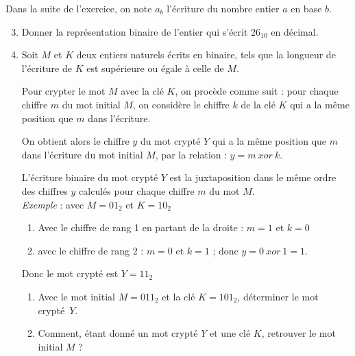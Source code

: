 \documentclass[a4paper,12pt]{article}
\begin{document}
Dans la suite de l'exercice, on note $a_b$ l'écriture du nombre entier $a$ en base $b$.

\begin{enumerate}[\bfseries 1.]
    \setcounter{enumi}{2}
    \item Donner la représentation binaire de l'entier qui s'écrit $26_{10}$ en décimal.
    \item Soit $M$ et $K$ deux entiers naturels écrits en binaire, tels que la longueur de l'écriture de $K$ est supérieure ou égale à celle de $M$.

    Pour crypter le mot $M$ avec la clé $K$, on procède comme suit : pour chaque chiffre $m$ du mot
    initial $M$, on considère le chiffre $k$ de la clé $K$ qui a la même position que $m$ dans l'écriture.

    On obtient alors le chiffre $y$ du mot crypté $Y$ qui a la même position que $m$ dans l'écriture du mot initial $M$, par la relation : $y = m \:xor\: k$.

    L'écriture binaire du mot crypté $Y$ est la juxtaposition dans le même ordre des chiffres $y$ calculés pour chaque chiffre $m$ du mot $M$.\\

        \emph{Exemple }:  avec $M = 01_2$ et $K = 10_2$\\
        \begin{enumerate}[--]
            \item Avec le chiffre de rang 1 en partant de la droite : $m = 1$ et $k = 0$
            \item avec le chiffre de rang 2 :  $m = 0$ et $k = 1$ ; donc $y = 0 \:xor\: 1 = 1$.
        \end{enumerate}
        Donc le mot crypté est $Y = 11_2$ \\

     \begin{enumerate}[\bfseries a.]
         \item 	Avec le mot initial $M =  011_2$ et la clé $K = 101_2$, déterminer le mot crypté~$Y$.
         \item 	Comment, étant donné un mot crypté $Y$ et une clé $K$, retrouver le mot initial $M$ ?
     \end{enumerate}

\end{enumerate}
\end{document}
